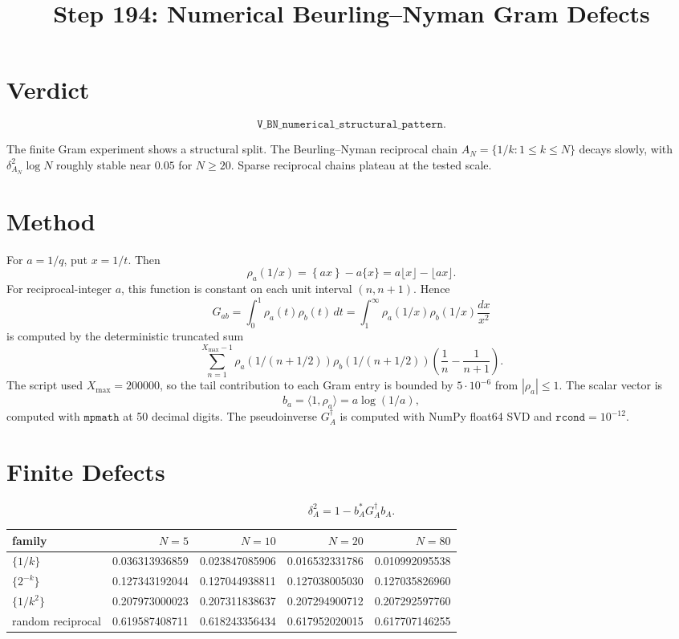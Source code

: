\documentclass[11pt]{article}
\title{Step 194: Numerical Beurling--Nyman Gram Defects}
\date{}
\begin{document}
\maketitle

\section*{Verdict}

\[
\boxed{\texttt{V\_BN\_numerical\_structural\_pattern}}.
\]

The finite Gram experiment shows a structural split.  The Beurling--Nyman reciprocal chain \(A_N=\{1/k:1\le k\le N\}\) decays slowly, with \(\delta_{A_N}^2\log N\) roughly stable near \(0.05\) for \(N\ge 20\).  Sparse reciprocal chains plateau at the tested scale.

\section*{Method}

For \(a=1/q\), put \(x=1/t\).  Then
\[
\rho_a(1/x)
=
\left\{ax\right\}-a\{x\}
=
a\lfloor x\rfloor-\lfloor ax\rfloor.
\]
For reciprocal-integer \(a\), this function is constant on each unit interval \((n,n+1)\).  Hence
\[
G_{ab}
=
\int_0^1 \rho_a(t)\rho_b(t)\,dt
=
\int_1^\infty
\rho_a(1/x)\rho_b(1/x)\frac{dx}{x^2}
\]
is computed by the deterministic truncated sum
\[
\sum_{n=1}^{X_{\max}-1}
\rho_a(1/(n+1/2))\rho_b(1/(n+1/2))
\left(\frac1n-\frac1{n+1}\right).
\]
The script used \(X_{\max}=200000\), so the tail contribution to each Gram entry is bounded by \(5\cdot 10^{-6}\) from \(|\rho_a|\le 1\).  The scalar vector is
\[
b_a=\langle 1,\rho_a\rangle=a\log(1/a),
\]
computed with \(\texttt{mpmath}\) at 50 decimal digits.  The pseudoinverse \(G_A^\dagger\) is computed with NumPy float64 SVD and \(\texttt{rcond}=10^{-12}\).

\section*{Finite Defects}

\[
\delta_A^2
=
1-b_A^*G_A^\dagger b_A.
\]

\begin{center}
\begin{tabular}{lrrrr}
family & \(N=5\) & \(N=10\) & \(N=20\) & \(N=80\)\\
\hline
\(\{1/k\}\) & 0.036313936859 & 0.023847085906 & 0.016532331786 & 0.010992095538\\
\(\{2^{-k}\}\) & 0.127343192044 & 0.127044938811 & 0.127038005030 & 0.127035826960\\
\(\{1/k^2\}\) & 0.207973000023 & 0.207311838637 & 0.207294900712 & 0.207292597760\\
random reciprocal & 0.619587408711 & 0.618243356434 & 0.617952020015 & 0.617707146255\\
\end{tabular}
\end{center}
\end{document}
